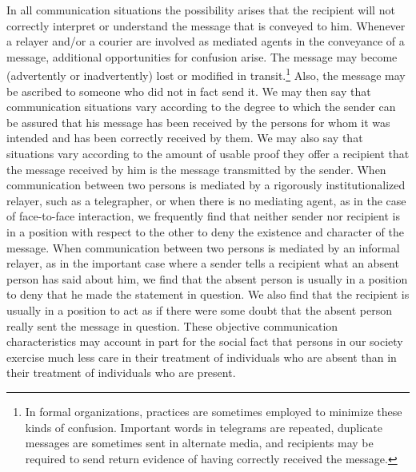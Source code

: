\documentclass[twoside,symmetric,nobib,justified]{tufte-book}
\begin{document}
In all communication situations the possibility arises that the
recipient will not correctly interpret or understand the message that is
conveyed to him. Whenever a relayer and/or a courier are involved as
mediated agents in the conveyance of a message, additional opportunities
for confusion arise. The message may become (advertently or
inadvertently) lost or modified in transit.\footnote{In formal
  organizations, practices are sometimes employed to minimize these
  kinds of confusion. Important words in telegrams are repeated,
  duplicate messages are sometimes sent in alternate media, and
  recipients may be required to send return evidence of having correctly
  received the message.} Also, the message may be ascribed to someone
who did not in fact send it. We may then say that communication
situations vary according to the degree to which the sender can be
assured that his message has been received by the persons for whom it
was intended and has been correctly received by them. We may also say
that situations vary according to the amount of usable proof they offer
a recipient that the message received by him is the message transmitted
by the sender. When communication between two persons is mediated by a
rigorously institutionalized relayer, such as a telegrapher, or when
there is no mediating agent, as in the case of face-to-face interaction,
we frequently find that neither sender nor recipient is in a position
with respect to the other to deny the existence and character of the
message. When communication between two persons is mediated by an
informal relayer, as in the important case where a sender tells a
recipient what an absent person has said about him, we find that the
absent person is usually in a position to deny that he made the
statement in question. We also find that the recipient is usually in a
position to act as if there were some doubt that the absent person
really sent the message in question. These objective communication
characteristics may account in part for the social fact that persons in
our society exercise much less care in their treatment of individuals
who are absent than in their treatment of individuals who are present.
\end{document}
